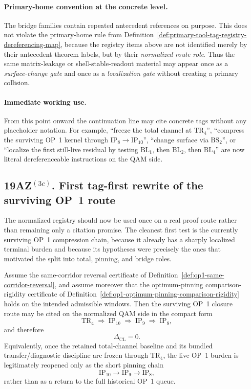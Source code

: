 \paragraph{Primary-home convention at the concrete level.}
The bridge families contain repeated antecedent references on purpose. This does not violate the primary-home rule from Definition~\ref{def:primary-tool-tag-registry-dereferencing-map}, because the registry items above are not identified merely by their antecedent theorem labels, but by their \emph{normalized route role}. Thus the same matrix-leakage or shell-stable-readout material may appear once as a \emph{surface-change gate} and once as a \emph{localization gate} without creating a primary collision.

\paragraph{Immediate working use.}
From this point onward the continuation line may cite concrete tags without any placeholder notation. For example, ``freeze the total channel at $\mathrm{TR}_4$'', ``compress the surviving OP~1 kernel through $\mathrm{IP}_8\to \mathrm{IP}_{10}$'', ``change surface via $\mathrm{BS}_2$'', or ``localize the first still-live residual by testing $\mathrm{BL}_1$, then $\mathrm{BL}_2$, then $\mathrm{BL}_4$'' are now literal dereferenceable instructions on the QAM side.


\subsection*{19AZ$^{(3c)}$. First tag-first rewrite of the surviving OP~1 route}
\label{sec:first-tag-first-rewrite-of-the-surviving-op1-route}
The normalized registry should now be used once on a real proof route rather than remaining only a citation promise. The cleanest first test is the currently surviving OP~1 compression chain, because it already has a sharply localized terminal burden and because its hypotheses were precisely the ones that motivated the split into total, pinning, and bridge roles.

\begin{proposition}
\label{prop:first-tag-first-op1-route}
Assume the same-corridor reversal certificate of Definition~\ref{def:op1-same-corridor-reversal}, and assume moreover that the optimum-pinning comparison-rigidity certificate of Definition~\ref{def:op1-optimum-pinning-comparison-rigidity} holds on the intended admissible windows. Then the surviving OP~1 closure route may be cited on the normalized QAM side in the compact form
\[
 \mathrm{TR}_4 \;\Longrightarrow\; \mathrm{IP}_{10} \;\Longrightarrow\; \mathrm{IP}_9 \;\Longrightarrow\; \mathrm{IP}_8,
\]
and therefore
\[
 \Delta_{\mathrm{CL}} = 0.
\]
Equivalently, once the retained total-channel baseline and its bundled transfer/diagnostic discipline are frozen through \(\mathrm{TR}_4\), the live OP~1 burden is legitimately reopened only as the short pinning chain
\[
 \mathrm{IP}_{10} \to \mathrm{IP}_9 \to \mathrm{IP}_8,
\]
rather than as a return to the full historical OP~1 queue.
\end{proposition}

